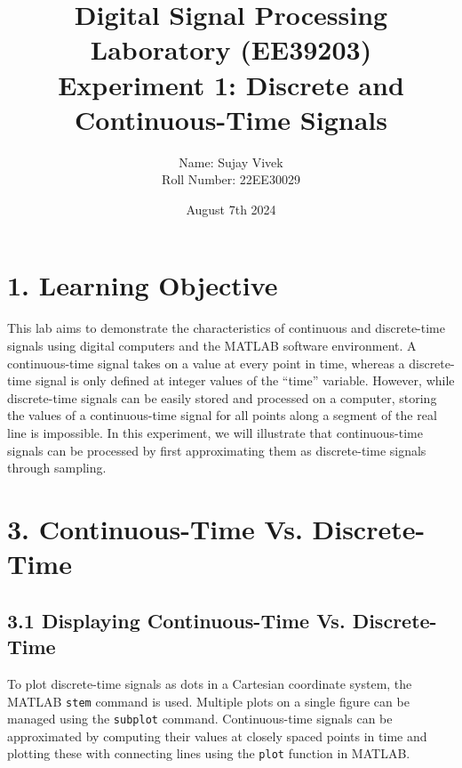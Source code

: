 \documentclass[a4paper,12pt,fleqn]{article}
\title{Digital Signal Processing Laboratory (EE39203)\\ Experiment 1: Discrete and Continuous-Time Signals}
\author{Name: Sujay Vivek \\
Roll Number: 22EE30029}
\date{August 7th 2024}
\begin{document}
\newpage
\maketitle  %



\section*{1. Learning Objective}
This lab aims to demonstrate the characteristics of continuous and discrete-time signals using digital computers and the MATLAB software environment. A 
continuous-time signal takes on a value at every point in time, whereas a discrete-time signal is only defined at integer values of the “time” variable. However, while discrete-time signals can be easily stored and processed on a computer, storing the values of a continuous-time signal for all points along a segment of the real line is impossible. In this experiment, we will illustrate that continuous-time signals can be processed by first approximating them as discrete-time signals through sampling.


\section*{3. Continuous-Time Vs. Discrete-Time}

\subsection*{3.1 Displaying Continuous-Time Vs. Discrete-Time}
To plot discrete-time signals as dots in a Cartesian coordinate system, the MATLAB \texttt{stem} command is used. Multiple plots on a single figure can be managed using the \texttt{subplot} command. Continuous-time signals can be approximated by computing their values at closely spaced points in time and plotting these with connecting lines using the \texttt{plot} function in MATLAB.

\newpage
\end{document}
